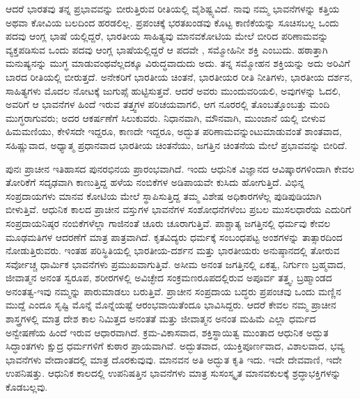 ಆದರೆ ಭಾರತವು ತನ್ನ ಪ್ರಭಾವವನ್ನು ಬೀರುತ್ತಿರುವ ರೀತಿಯಲ್ಲಿ ವೈಶಿಷ್ಟ್ಯವಿದೆ. ನಾವು ನಮ್ಮ ಭಾವನೆಗಳನ್ನು ಕತ್ತಿಯ ಅಥವಾ ಕೋವಿಯ ಬಲದಿಂದ ಹರಡಲಿಲ್ಲ. ಪ್ರಪಂಚಕ್ಕೆ ಭರತಖಂಡವು ಕೊಟ್ಟ ಕಾಣಿಕೆಯನ್ನು ಸೂಚಿಸಬಲ್ಲ ಒಂದು ಪದವು ಆಂಗ್ಲ ಭಾಷೆ\- ಯಲ್ಲಿದ್ದರೆ, ಭಾರತೀಯ ಸಾಹಿತ್ಯವು ಮಾನವಕೋಟಿಯ ಮೇಲೆ ಬೀರಿದ ಪರಿಣಾಮವನ್ನು ವ್ಯಕ್ತಪಡಿಸುವ ಒಂದು ಪದವು ಆಂಗ್ಲ ಭಾಷೆಯಲ್ಲಿದ್ದರೆ ಆ ಪದವೇ , ಸಮ್ಮೋಹಿನೀ ಶಕ್ತಿ ಎಂಬುದು. ಹಠಾತ್ತಾಗಿ ಮನುಷ್ಯನನ್ನು ಮುಗ್ಧ ಮಾಡುವಂಥವೆಲ್ಲದಕ್ಕೂ ವಿರುದ್ಧವಾದುದು ಅದು. ತನ್ನ ಸಮ್ಮೋಹನ ಶಕ್ತಿಯನ್ನು ಅದು ಅರಿವಿಗೆ ಬಾರದ ರೀತಿಯಲ್ಲಿ ಬೀರುತ್ತದೆ. ಅನೇಕರಿಗೆ ಭಾರತೀಯ ಚಿಂತನೆ, ಭಾರತೀಯರ ರೀತಿ ನೀತಿಗಳು, ಭಾರತೀಯ ದರ್ಶನ, ಸಾಹಿತ್ಯಗಳು ಮೊದಲ ನೋಟಕ್ಕೆ ಜುಗುಪ್ಸೆ ಹುಟ್ಟಿಸುತ್ತವೆ. ಆದರೆ ಅವರು ಮುಂದುವರಿಯಲಿ, ಅವುಗಳನ್ನು ಓದಲಿ, ಅವರಿಗೆ ಆ ಭಾವನೆಗಳ ಹಿಂದೆ ಇರುವ ತತ್ತ್ವಗಳ ಪರಿಚಯವಾಗಲಿ, ಆಗ ನೂರರಲ್ಲಿ ತೊಂಬತ್ತೊಂಬತ್ತು ಮಂದಿ ಮುಗ್ಧರಾಗುವರು; ಅದರ ಆಕರ್ಷಣೆಗೆ ಸಿಲುಕುವರು. ನಿಧಾನವಾಗಿ, ಮೌನವಾಗಿ, ಮುಂಜಾನೆ\- ಯಲ್ಲಿ ಬೀಳುವ ಹಿಮಮಣಿಯು, ಕೇಳಿಸದೇ ಇದ್ದರೂ, ಕಾಣದೇ ಇದ್ದರೂ, ಅದ್ಭುತ ಪರಿಣಾಮವನ್ನುಂಟುಮಾಡುವಂತೆ ಶಾಂತವಾದ, ಸಹಿಷ್ಣುವಾದ, ಅಧ್ಯಾತ್ಮ ಪ್ರಧಾನವಾದ ಭಾರತೀಯ ಚಿಂತನೆಯು, ಜಗತ್ತಿನ ಚಿಂತನೆಯ ಮೇಲೆ ಪ್ರಭಾವವನ್ನು ಬೀರಿದೆ.

ಪುನಃ ಪ್ರಾಚೀನ ಇತಿಹಾಸದ ಪುನರಭಿನಯ ಪ್ರಾರಂಭವಾಗಿದೆ. ಇಂದು ಆಧುನಿಕ ವಿಜ್ಞಾನದ ಆವಿಷ್ಕಾರಗಳಿಂದಾಗಿ ಕೇವಲ ತೋರಿಕೆಗೆ ಸದೃಢವಾಗಿ ಕಾಣುತ್ತಿದ್ದ ಹಳೆಯ ನಂಬಿಕೆಗಳ ಅಡಿಪಾಯವೇ ಕುಸಿದು ಹೋಗುತ್ತಿದೆ. ವಿಭಿನ್ನ ಸಂಪ್ರದಾಯಗಳು ಮಾನವ ಕೋಟಿಯ ಮೇಲೆ ಸ್ಥಾಪಿಸುತ್ತಿದ್ದ ತಮ್ಮ ವಿಶೇಷ ಅಧಿಕಾರಗಳೆಲ್ಲ ಪುಡಿಪುಡಿಯಾಗಿ ಬೀಳುತ್ತಿವೆ. ಆಧುನಿಕ ಕಾಲದ ಪ್ರಾಚೀನ ವಸ್ತುಗಳ ಭಾವನೆಗಳ ಸಂಶೋಧನೆಗಳೆಂಬ ಪ್ರಬಲ ಮುಸಲಧಾರೆಯ ಎದುರಿಗೆ ಸಂಪ್ರದಾಯನಿಷ್ಠರ ನಂಬಿಕೆಗಳೆಲ್ಲಾ ಗಾಜಿನಂತೆ ಚೂರು ಚೂರಾಗುತ್ತಿವೆ. ಪಾಶ್ಚಾತ್ಯ ಜಗತ್ತಿನಲ್ಲಿ ಧರ್ಮವು ಕೇವಲ ಮೂಢಮತಿಗಳ ಆದರಣೆಗೆ ಮಾತ್ರ ಪಾತ್ರವಾಗಿದೆ. ಕೃತವಿದ್ಯರು ಧರ್ಮಕ್ಕೆ ಸಂಬಂಧಪಟ್ಟ ಅಂಶಗಳನ್ನು ತಾತ್ಸಾರದಿಂದ ನೋಡುತ್ತಿರುವರು. ಇಂತಹ ಪರಿಸ್ಥಿತಿಯಲ್ಲಿ ಭಾರತೀಯ-ದರ್ಶನ ಮತ್ತು ಭಾರತೀಯರು ಅನುಷ್ಠಾನದಲ್ಲಿ ತೋರುವ ಸರ್ವೋಚ್ಚ ಧಾರ್ಮಿಕ ಭಾವನೆಗಳು ಪ್ರಮುಖವಾಗುತ್ತಿವೆ. ಅಸೀಮ ಅನಂತ ಜಗತ್ತಿನಲ್ಲಿ ಏಕತ್ವ, ನಿರ್ಗುಣ ಬ್ರಹ್ಮವಾದ, ಜೀವಾತ್ಮನ ಅನಂತ ಸ್ವರೂಪ, ಶರೀರಗಳಲ್ಲಿ ಅವಿಚ್ಛೇದ ಸಂಕ್ರಮಣರೂಪದಲ್ಲಿರುವ ಅಪೂರ್ವ ತತ್ತ್ವ, ಬ್ರಹ್ಮಾಂಡದ ಅನಂತತ್ವ-ಇವು ನಮ್ಮನ್ನು ಪಾರುಮಾಡಲು ಬರುತ್ತಿವೆ. ಪ್ರಾಚೀನ ಸಂಪ್ರದಾಯ ಬದ್ಧರು ಪ್ರಪಂಚವು ಒಂದು ಮಣ್ಣಿನ ಮುದ್ದೆ ಎಂದೂ ಸೃಷ್ಟಿ ಮೊನ್ನೆ ಮೊನ್ನೆಯಷ್ಟೆ ಆರಂಭವಾಯಿತೆಂದೂ ಭಾವಿಸಿದ್ದರು. ಆದರೆ ಕೇವಲ ನಮ್ಮ ಪ್ರಾಚೀನ ಶಾಸ್ತ್ರಗಳಲ್ಲಿ ಮಾತ್ರ ದೇಶ ಕಾಲ ನಿಮಿತ್ತದ ಅನಂತತೆ ಮತ್ತು ಜೀವಾತ್ಮನ ಅನಂತ ಮಹಿಮೆ ಎಲ್ಲಾ ಧರ್ಮದ ಅನ್ವೇಷಣೆಯ ಹಿಂದೆ ಇರುವ ಆಧಾರವಾಗಿದೆ. ಕ್ರಮ-ವಿಕಾಸವಾದ, ಶಕ್ತಿಸ್ಥಾಯಿತ್ವ\break {} ಮುಂತಾದ ಆಧುನಿಕ ಅದ್ಭುತ ಸಿದ್ಧಾಂತಗಳು ಕ್ಷುದ್ರ ಧರ್ಮಗಳಿಗೆ ಕುಠಾರ ಪ್ರಾಯವಾಗಿವೆ. ಅದ್ಭುತವಾದ, ಯುಕ್ತಿಪೂರ್ಣವಾದ, ವಿಶಾಲವಾದ, ಭವ್ಯ ಭಾವನೆಗಳು ವೇದಾಂತದಲ್ಲಿ ಮಾತ್ರ ದೊರಕುವುವು. ಮಾನವನ ಅತಿ ಅದ್ಭುತ ಕೃತಿ ಇದು. ಇದೇ ದೇವವಾಣಿ, ಇದೇ ಉಪನಿಷತ್ತು. ಆಧುನಿಕ ಕಾಲದಲ್ಲಿ ಉಪನಿಷತ್ತಿನ ಭಾವನೆಗಳು ಮಾತ್ರ ಸುಸಂಸ್ಕೃತ ಮಾನವಕುಲಕ್ಕೆ ಶ್ರದ್ಧಾಭಕ್ತಿಗಳನ್ನು ಕೊಡಬಲ್ಲವು.

